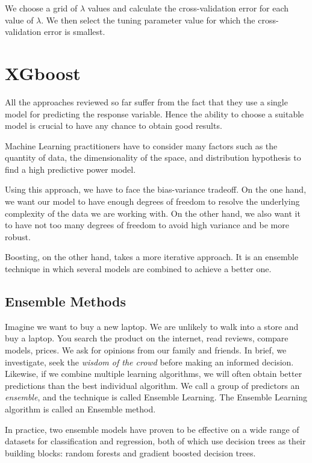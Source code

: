 We choose a grid of $\lambda$ values and calculate the cross-validation error
for each value of $\lambda$. We then select the tuning parameter value for which
the cross-validation error is smallest.


\section{XGboost}

All the approaches reviewed so far suffer from the fact that they use a single
model for predicting the response variable. Hence the ability to choose a
suitable model is crucial to have any chance to obtain good results.

\noindent Machine Learning practitioners have to consider many factors such as
the quantity of data, the dimensionality of the space, and distribution
hypothesis to find a high predictive power model.

Using this approach, we have to face the bias-variance tradeoff. On the one
hand, we want our model to have enough degrees of freedom to resolve the
underlying complexity of the data we are working with. On the other hand, we
also want it to have not too many degrees of freedom to avoid high variance and
be more robust.

Boosting, on the other hand, takes a more iterative approach. It is an ensemble
technique in which several models are combined to achieve a better one.

\subsection{Ensemble Methods}

Imagine we want to buy a new laptop. We are unlikely to walk into a store and
buy a laptop. You search the product on the internet, read reviews, compare
models, prices. We ask for opinions from our family and friends. In brief, we
investigate, seek the \textit{wisdom of the crowd} before making an informed
decision.\newline
Likewise, if we combine multiple learning algorithms, we will often obtain
better predictions than the best individual algorithm. We call a group of
predictors an \textit{ensemble}, and the technique is called Ensemble Learning. The
Ensemble Learning algorithm is called an Ensemble method.

In practice, two ensemble models have proven to be effective on a wide range of
datasets for classification and regression, both of which use decision trees as
their building blocks: random forests and gradient boosted decision trees.

